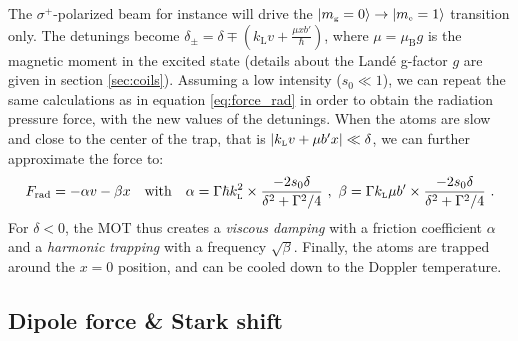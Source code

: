 \documentclass[11pt]{article}
\newcommand{\mathsc}[1]{\mathrm{\scriptscriptstyle {#1}}}
\numberwithin{equation}{section}
\numberwithin{figure}{section}
\begin{document}
The $\sigma^+$-polarized beam for instance will drive the $\ket{m_\mathsc{g}=0} \rightarrow \ket{m_\mathsc{e}=1}$ transition only. The detunings become $\delta_\pm = \delta \mp \left( k_\mathsc{L} v + \frac{\mu x b'}{\hbar} \right)$, where $\mu = \mu_\mathsc{B} g$ is the magnetic moment in the excited state (details about the Landé g-factor $g$ are given in section \ref{sec:coils}). Assuming a low intensity ($s_0 \ll 1$), we can repeat the same calculations as in equation \eqref{eq:force_rad} in order to obtain the radiation pressure force, with the new values of the detunings. When the atoms are slow and close to the center of the trap, that is $\abs{k_\mathsc{L}v + \mu b' x} \ll \delta$, we can further approximate the force to:
%
\begin{equation}
	F_\text{rad} = - \alpha v - \beta x \qq{with} \alpha = \Gamma \hbar k_\mathsc{L}^2 \times \frac{-2 s_0 \delta}{\delta^2 + \Gamma^2 / 4} ~,~ \beta =\Gamma k_\mathsc{L} \mu b' \times \frac{-2 s_0 \delta}{\delta^2 + \Gamma^2 / 4} ~. 
\end{equation}
%
For $\delta < 0$, the MOT thus creates a \emph{viscous damping} with a friction coefficient $\alpha$ and a \emph{harmonic trapping} with a frequency $\sqrt{\beta}$. Finally, the atoms are trapped around the $x=0$ position, and can be cooled down to the Doppler temperature.


\subsection{Dipole force \& Stark shift}
\label{sec:lattice_theory}
\end{document}
